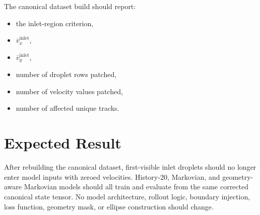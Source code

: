 \documentclass[11pt]{article}
\begin{document}
The canonical dataset build should report:
\begin{itemize}
    \item the inlet-region criterion,
    \item \(\bar{v}_x^{\mathrm{inlet}}\),
    \item \(\bar{v}_y^{\mathrm{inlet}}\),
    \item number of droplet rows patched,
    \item number of velocity values patched,
    \item number of affected unique tracks.
\end{itemize}

\section{Expected Result}

After rebuilding the canonical dataset, first-visible inlet droplets should no
longer enter model inputs with zeroed velocities. History-20, Markovian, and
geometry-aware Markovian models should all train and evaluate from the same
corrected canonical state tensor. No model architecture, rollout logic,
boundary injection, loss function, geometry mask, or ellipse construction
should change.
\end{document}
